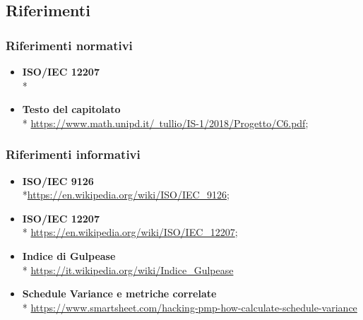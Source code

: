 \subsection{Riferimenti}
\subsubsection{Riferimenti normativi}
\begin{itemize}
\item \textbf{ISO/IEC 12207} \\* %
\item \textbf{Testo del capitolato} \\*  \href{https://www.math.unipd.it/~tullio/IS-1/2018/Progetto/C6.pdf}{https://www.math.unipd.it/~tullio/IS-1/2018/Progetto/C6.pdf};
\end{itemize}
\subsubsection{Riferimenti informativi}
\begin{itemize}
\item \textbf{ISO/IEC 9126} \\*\href{https://en.wikipedia.org/wiki/ISO/IEC_9126}{https://en.wikipedia.org/wiki/ISO/IEC\_9126};
\item \textbf{ISO/IEC 12207} \\* 
\href{https://en.wikipedia.org/wiki/ISO/IEC_12207}{https://en.wikipedia.org/wiki/ISO/IEC\_12207};
\item \textbf{Indice di Gulpease} \\* \href{https://it.wikipedia.org/wiki/Indice_Gulpease}{https://it.wikipedia.org/wiki/Indice\_Gulpease}



\item \textbf{Schedule Variance e metriche correlate}\\* \href{https://www.smartsheet.com/hacking-pmp-how-calculate-schedule-variance}{https://www.smartsheet.com/hacking-pmp-how-calculate-schedule-variance}

\end{itemize}